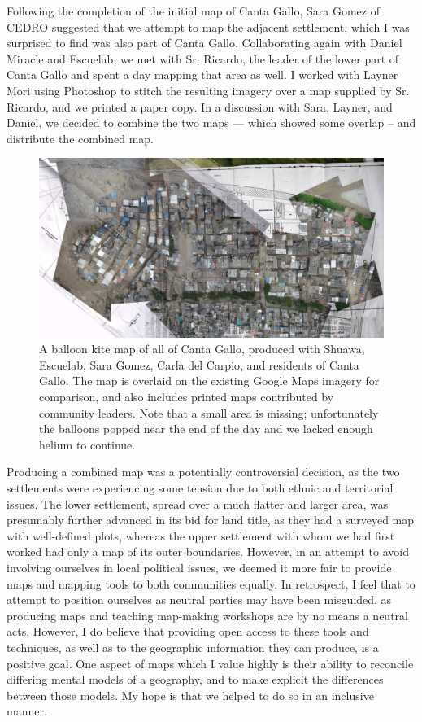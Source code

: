 \documentclass[11pt]{report}
\begin{document}
Following the completion of the initial map of Canta Gallo, Sara Gomez of CEDRO suggested that we attempt to map the adjacent settlement, which I was surprised to find was also part of Canta Gallo. Collaborating again with Daniel Miracle and Escuelab, we met with Sr. Ricardo, the leader of the lower part of Canta Gallo and spent a day mapping that area as well. I worked with Layner Mori using Photoshop to stitch the resulting imagery over a map supplied by Sr. Ricardo, and we printed a paper copy. In a discussion with Sara, Layner, and Daniel, we decided to combine the two maps --- which showed some overlap -- and distribute the combined map. 

\begin{figure}[h]
  \begin{center}
	\includegraphics[width=1\textwidth]{images/cantagallo-combined.jpg}
	\caption{A balloon kite map of all of Canta Gallo, produced with Shuawa, Escuelab, Sara Gomez, Carla del Carpio, and residents of Canta Gallo. The map is overlaid on the existing Google Maps imagery for comparison, and also includes printed maps contributed by community leaders. Note that a small area is missing; unfortunately the balloons popped near the end of the day and we lacked enough helium to continue.}
  \end{center}
\end{figure}

Producing a combined map was a potentially controversial decision, as the two settlements were experiencing some tension due to both ethnic and territorial issues. The lower settlement, spread over a much flatter and larger area, was presumably further advanced in its bid for land title, as they had a surveyed map with well-defined plots, whereas the upper settlement with whom we had first worked had only a map of its outer boundaries. However, in an attempt to avoid involving ourselves in local political issues, we deemed it more fair to provide maps and mapping tools to both communities equally. In retrospect, I feel that to attempt to position ourselves as neutral parties may have been misguided, as producing maps and teaching map-making workshops are by no means a neutral acts. However, I do believe that providing open access to these tools and techniques, as well as to the geographic information they can produce, is a positive goal. One aspect of maps which I value highly is their ability to reconcile differing mental models of a geography, and to make explicit the differences between those models. My hope is that we helped to do so in an inclusive manner. 
\end{document}
